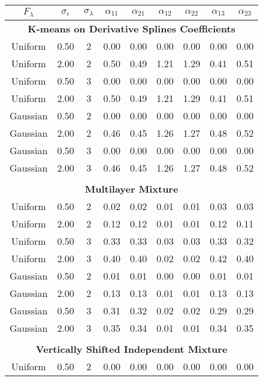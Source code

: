 \begin{table}[ht]
\centering
\begin{tabular}{ccc|cccccc}
  \thickhline $F_{\lambda}$&$\sigma_{\epsilon}$&$\sigma_{\lambda}$&$\alpha_{11}$&$\alpha_{21}$&$\alpha_{12}$&$\alpha_{22}$&$\alpha_{13}$&$\alpha_{23}$\\  \hline\multicolumn{9}{c}{\textbf{K-means on Derivative Splines Coefficients}}\\ Uniform & 0.50 &   2 & 0.00 & 0.00 & 0.00 & 0.00 & 0.00 & 0.00 \\ 
  Uniform & 2.00 &   2 & 0.50 & 0.49 & 1.21 & 1.29 & 0.41 & 0.51 \\ 
  Uniform & 0.50 &   3 & 0.00 & 0.00 & 0.00 & 0.00 & 0.00 & 0.00 \\ 
  Uniform & 2.00 &   3 & 0.50 & 0.49 & 1.21 & 1.29 & 0.41 & 0.51 \\ 
  Gaussian & 0.50 &   2 & 0.00 & 0.00 & 0.00 & 0.00 & 0.00 & 0.00 \\ 
  Gaussian & 2.00 &   2 & 0.46 & 0.45 & 1.26 & 1.27 & 0.48 & 0.52 \\ 
  Gaussian & 0.50 &   3 & 0.00 & 0.00 & 0.00 & 0.00 & 0.00 & 0.00 \\ 
  Gaussian & 2.00 &   3 & 0.46 & 0.45 & 1.26 & 1.27 & 0.48 & 0.52 \\ 
   \\ \multicolumn{9}{c}{\textbf{Multilayer Mixture}}\\Uniform & 0.50 &   2 & 0.02 & 0.02 & 0.01 & 0.01 & 0.03 & 0.03 \\ 
  Uniform & 2.00 &   2 & 0.12 & 0.12 & 0.01 & 0.01 & 0.12 & 0.11 \\ 
  Uniform & 0.50 &   3 & 0.33 & 0.33 & 0.03 & 0.03 & 0.33 & 0.32 \\ 
  Uniform & 2.00 &   3 & 0.40 & 0.40 & 0.02 & 0.02 & 0.42 & 0.40 \\ 
  Gaussian & 0.50 &   2 & 0.01 & 0.01 & 0.00 & 0.00 & 0.01 & 0.01 \\ 
  Gaussian & 2.00 &   2 & 0.13 & 0.13 & 0.01 & 0.01 & 0.13 & 0.13 \\ 
  Gaussian & 0.50 &   3 & 0.31 & 0.32 & 0.02 & 0.02 & 0.29 & 0.29 \\ 
  Gaussian & 2.00 &   3 & 0.35 & 0.34 & 0.01 & 0.01 & 0.34 & 0.35 \\ 
   \\ \multicolumn{9}{c}{\textbf{Vertically Shifted Independent Mixture}}\\Uniform & 0.50 &   2 & 0.00 & 0.00 & 0.00 & 0.00 & 0.00 & 0.00 \\ 

\end{tabular}
\end{table}
